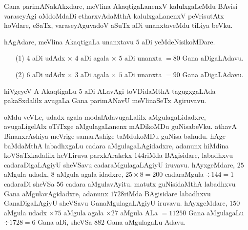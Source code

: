 Gana parimANakAkxdare, meVlina AkaqtigaLanenxV kalulxgaLeMdu BAvisi
varaseyAgi oMdoMdaDi etharxvAdaMthA kalulxgaLanenxV peVrisutAtx
hoVdare, eSaTx, varaseyAguvadoV aSuTx aDi unanxtaveMdu tiLiya beVku.

hAgAdare, meVlina AkaqtigaLa unanxtavu $5$ aDi yeMdeNisikoMDare.
\begin{itemize}
\item[\rm(1)] $4$ aDi udAdx $\times$ $4$ aDi agala $\times$ $5$ aDi
  unanxta $=80$ Gana aDigaLAdavu.

\item[\rm(2)] $6$ aDi udAdx $\times$ $3$ aDi agala $\times$ $5$ aDi
  unanxta $=90$ Gana aDigaLAdavu.
\end{itemize}

hiVgeyeV A AkaqtigaLu $5$ aDi ALavAgi toVDidaMthA tagugxgaLAda
pakaSxdalilx avugaLa Gana parimANavU meVlinaSeTx Agiruvavu.

oMdu veVLe, udadx agala modalAdavugaLalilx aMgulagaLidadxre,
avugaLigelAlx oTiTxge aMgulagaLanenx mADikoMDu guNisabeVku. athavA
BinanxrAshiya meVrige samarAshige taMdukoMDu guNisa bahudu. hAge
baMdaMthA labadhxgaLu cadara aMgulagaLAgidadxre, adanunx hiMdina
koVSaTxkadalilx heVLiruva parxkArakekx $144$riMda BAgisidare,
labadhxvu cadaraDigaLAgiyU sheVSavu cadaraMgulagaLAgiyU
iruvavu. hAyxgeMdare, $25$ aMgula udadx, $8$ aMgula agala idadxre,
$25\times 8=200$ cadaraMgula $\div 144=1$ cadaraDi sheVSa $56$ cadara
aMgulavAyitu. matutx guNisidaMthA \hbox{labadhxvu} Gana aMgulavAgidadxre,
adanunx $1728$riMda BAgisidare labadhxvu GanaDigaLAgiyU sheVSavu
GanaMgulagaLAgiyU iruvavu. hAyxgeMdare, $150$ aMgula udadx $\times 75$
aMgula agala $\times 27$ aMgula ALa $=11250$ Gana aMgulagaLu $\div
1728=6$ Gana aDi, sheVSa $882$ Gana aMgulagaLu Adavu.

